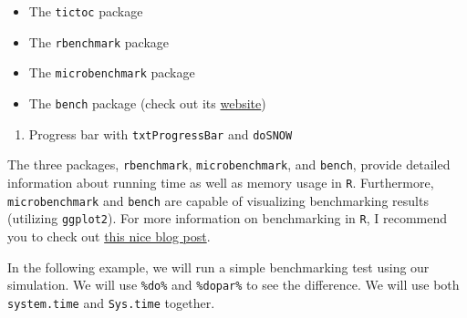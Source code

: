 \documentclass[
]{book}
\providecommand{\tightlist}{%
  \setlength{\itemsep}{0pt}\setlength{\parskip}{0pt}}
\begin{document}
\begin{itemize}
\tightlist
\item
  The \texttt{tictoc} package \citep{R-tictoc}
\item
  The \texttt{rbenchmark} package \citep{R-rbenchmark}
\item
  The \texttt{microbenchmark} package \citep{R-microbenchmark}
\item
  The \texttt{bench} package \citep{R-bench} (check out its \href{https://github.com/r-lib/bench}{website})
\end{itemize}

\begin{enumerate}
\def\labelenumi{\arabic{enumi}.}
\setcounter{enumi}{2}
\tightlist
\item
  Progress bar with \texttt{txtProgressBar} and \texttt{doSNOW} \citep{R-doSNOW}
\end{enumerate}

The three packages, \texttt{rbenchmark}, \texttt{microbenchmark}, and \texttt{bench}, provide detailed information about running time as well as memory usage in \texttt{R}. Furthermore, \texttt{microbenchmark} and \texttt{bench} are capable of visualizing benchmarking results (utilizing \texttt{ggplot2}). For more information on benchmarking in \texttt{R}, I recommend you to check out \href{https://www.alexejgossmann.com/benchmarking_r/}{this nice blog post}.

In the following example, we will run a simple benchmarking test using our simulation. We will use \texttt{\%do\%} and \texttt{\%dopar\%} to see the difference. We will use both \texttt{system.time} and \texttt{Sys.time} together.
\end{document}
